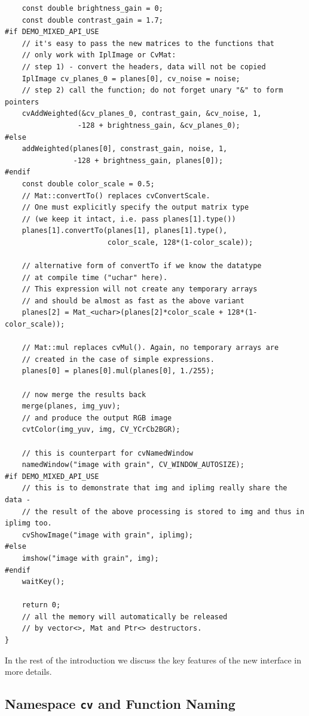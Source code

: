 \begin{lstlisting}
    const double brightness_gain = 0;
    const double contrast_gain = 1.7;
#if DEMO_MIXED_API_USE
    // it's easy to pass the new matrices to the functions that
    // only work with IplImage or CvMat:
    // step 1) - convert the headers, data will not be copied
    IplImage cv_planes_0 = planes[0], cv_noise = noise;
    // step 2) call the function; do not forget unary "&" to form pointers
    cvAddWeighted(&cv_planes_0, contrast_gain, &cv_noise, 1,
                 -128 + brightness_gain, &cv_planes_0);
#else
    addWeighted(planes[0], constrast_gain, noise, 1,
                -128 + brightness_gain, planes[0]);
#endif
    const double color_scale = 0.5;
    // Mat::convertTo() replaces cvConvertScale.
    // One must explicitly specify the output matrix type
    // (we keep it intact, i.e. pass planes[1].type())
    planes[1].convertTo(planes[1], planes[1].type(),
                        color_scale, 128*(1-color_scale));

    // alternative form of convertTo if we know the datatype
    // at compile time ("uchar" here).
    // This expression will not create any temporary arrays
    // and should be almost as fast as the above variant
    planes[2] = Mat_<uchar>(planes[2]*color_scale + 128*(1-color_scale));

    // Mat::mul replaces cvMul(). Again, no temporary arrays are
    // created in the case of simple expressions.
    planes[0] = planes[0].mul(planes[0], 1./255);

    // now merge the results back
    merge(planes, img_yuv);
    // and produce the output RGB image
    cvtColor(img_yuv, img, CV_YCrCb2BGR);

    // this is counterpart for cvNamedWindow
    namedWindow("image with grain", CV_WINDOW_AUTOSIZE);
#if DEMO_MIXED_API_USE
    // this is to demonstrate that img and iplimg really share the data -
    // the result of the above processing is stored to img and thus in iplimg too.
    cvShowImage("image with grain", iplimg);
#else
    imshow("image with grain", img);
#endif
    waitKey();

    return 0;
    // all the memory will automatically be released
    // by vector<>, Mat and Ptr<> destructors.
}
\end{lstlisting}

In the rest of the introduction we discuss the key features of the new interface in more details.

\subsection{Namespace \texttt{cv} and Function Naming}

